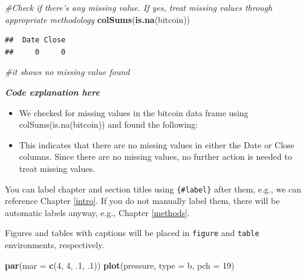 \documentclass[
]{book}
\newenvironment{Shaded}{\begin{snugshade}}{\end{snugshade}}
\newcommand{\AttributeTok}[1]{\textcolor[rgb]{0.13,0.29,0.53}{#1}}
\newcommand{\CommentTok}[1]{\textcolor[rgb]{0.56,0.35,0.01}{\textit{#1}}}
\newcommand{\DecValTok}[1]{\textcolor[rgb]{0.00,0.00,0.81}{#1}}
\newcommand{\FunctionTok}[1]{\textcolor[rgb]{0.13,0.29,0.53}{\textbf{#1}}}
\newcommand{\NormalTok}[1]{#1}
\newcommand{\StringTok}[1]{\textcolor[rgb]{0.31,0.60,0.02}{#1}}
\providecommand{\tightlist}{%
  \setlength{\itemsep}{0pt}\setlength{\parskip}{0pt}}
\begin{document}
\begin{Shaded}
\begin{Highlighting}[]
\CommentTok{\#Check if there’s any missing value. If yes, treat missing values through appropriate methodology}
\FunctionTok{colSums}\NormalTok{(}\FunctionTok{is.na}\NormalTok{(bitcoin))}
\end{Highlighting}
\end{Shaded}

\begin{verbatim}
##  Date Close 
##     0     0
\end{verbatim}

\begin{Shaded}
\begin{Highlighting}[]
\CommentTok{\#it shows no missing value found}
\end{Highlighting}
\end{Shaded}

\emph{\textbf{Code explanation here}}

\begin{itemize}
\tightlist
\item
  We checked for missing values in the bitcoin data frame using colSums(is.na(bitcoin)) and found the following:
\item
  This indicates that there are no missing values in either the Date or Close columns. Since there are no missing values, no further action is needed to treat missing values.
\end{itemize}

You can label chapter and section titles using \texttt{\{\#label\}} after them, e.g., we can reference Chapter \ref{intro}. If you do not manually label them, there will be automatic labels anyway, e.g., Chapter \ref{methods}.

Figures and tables with captions will be placed in \texttt{figure} and \texttt{table} environments, respectively.

\begin{Shaded}
\begin{Highlighting}[]
\FunctionTok{par}\NormalTok{(}\AttributeTok{mar =} \FunctionTok{c}\NormalTok{(}\DecValTok{4}\NormalTok{, }\DecValTok{4}\NormalTok{, .}\DecValTok{1}\NormalTok{, .}\DecValTok{1}\NormalTok{))}
\FunctionTok{plot}\NormalTok{(pressure, }\AttributeTok{type =} \StringTok{\textquotesingle{}b\textquotesingle{}}\NormalTok{, }\AttributeTok{pch =} \DecValTok{19}\NormalTok{)  }
\end{Highlighting}
\end{Shaded}
\end{document}
